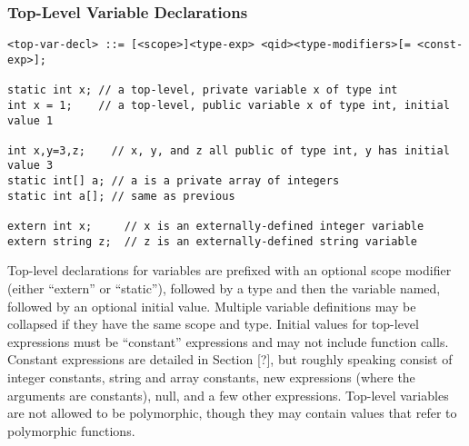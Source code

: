 \documentclass[titlepage,10pt]{article}
\begin{document}
\subsubsection{Top-Level Variable Declarations}


\begin{verbatim}
<top-var-decl> ::= [<scope>]<type-exp> <qid><type-modifiers>[= <const-exp>];

static int x; // a top-level, private variable x of type int
int x = 1;    // a top-level, public variable x of type int, initial value 1

int x,y=3,z;    // x, y, and z all public of type int, y has initial value 3
static int[] a; // a is a private array of integers
static int a[]; // same as previous

extern int x;     // x is an externally-defined integer variable
extern string z;  // z is an externally-defined string variable
\end{verbatim}

Top-level declarations for variables are prefixed with an optional scope
modifier (either ``extern'' or ``static''), followed by a type and then
the variable named, followed by an optional initial value.  Multiple
variable definitions may be collapsed if they have the same scope and
type.  Initial values for top-level expressions must be ``constant''
expressions and may not include function calls.  Constant expressions
are detailed in Section [?], but roughly speaking consist of integer
constants, string and array constants, new expressions (where the
arguments are constants), null, and a few other expressions.  Top-level
variables are not allowed to be polymorphic, though they may contain
values that refer to polymorphic functions.
\end{document}

